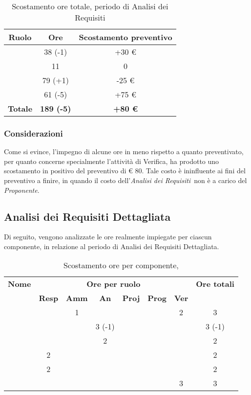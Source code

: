 \begin{table}[H]
	\begin{center}
		\begin{tabular}{|c|c|c|}
			\hline
			\textbf{Ruolo}	& \textbf{Ore}	& \textbf{Scostamento preventivo} \\
			\hline
			\Res	&	38 (-1)	&  +30 € \\
			\hline
			\Amm	&	11	&  0 \\
			\hline
			\Ana	&	79 (+1)	&  -25 € \\
			\hline
			\Ver	&	61 (-5)	&  +75 €\\
			\hline
			\textbf{Totale} & \textbf{189 (-5)} & \textbf{+80 €}\\
			\hline
		\end{tabular}
	\end{center}
	\caption{Scostamento ore totale, periodo di Analisi dei Requisiti}
\end{table}

\subsubsection{Considerazioni}
Come si evince, l'impegno di alcune ore in meno rispetto a quanto preventivato, per quanto concerne specialmente l'attività di Verifica, ha prodotto uno scostamento in positivo del preventivo di € 80. Tale costo è ininfluente ai fini del preventivo a finire, in quando il costo dell'\textit{Analisi dei Requisiti}\ non è a carico del \textit{Proponente}.


\newpage
\subsection{Analisi dei Requisiti Dettagliata}

Di seguito, vengono analizzate le ore realmente impiegate per ciascun componente, in relazione al periodo di Analisi dei Requisiti Dettagliata.

\begin{table}[H]
	\begin{center}
		\begin{tabular}{|c|c|c|c|c|c|c|c|}
			\hline
			\textbf{Nome} & \multicolumn{6}{c|}{\textbf{Ore per ruolo}} & \textbf{Ore totali} \\\cline{2-7}
			& \textbf{Resp} & \textbf{Amm} & \textbf{An} & \textbf{Proj} & \textbf{Prog} & \textbf{Ver} & \\
			\hline
			\MC			&		&	1	&	 	&		&		&	2 	&	 3	\\
			\hline
			\AN			&		&		&	3 (-1) 	&	 	&		&	 	& 	 3 (-1)	\\
			\hline
			\DAN		&		&	 	&	2 	&		&		&		&	 2	\\
			\hline
			\AS			&	2	&	 	&	  	&		&	 	& 		&	 2	\\
			\hline
			\NS 		&	2	&		&	 	&		&		& 		&	 2	\\
			\hline
			\DS			& 		&	 	&	 	&		&		&	3 	&	 3	\\
			\hline
		\end{tabular}
	\end{center}
	\caption{Scostamento ore per componente, \ARD}
\end{table}

